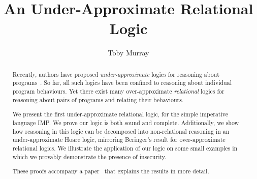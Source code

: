\documentclass[11pt,a4paper]{article}
\begin{document}
\title{An Under-Approximate Relational Logic}
\author{Toby Murray}
\maketitle

\begin{abstract}
  Recently, authors have proposed \emph{under-approximate} logics for
  reasoning about programs~\cite{OHearn_19,deVries_Koutavas_11}.
  So far, all such logics have been confined to
  reasoning about individual program behaviours. Yet there exist many
  over-approximate \emph{relational} logics for reasoning about pairs of
  programs and relating their behaviours.

  We present the first under-approximate relational
  logic, for the simple imperative language IMP.
  We prove our logic
  is both sound and complete.
  Additionally,
  we show how reasoning in this logic
  can be decomposed into non-relational reasoning in an under-approximate
  Hoare logic, mirroring Beringer's result for over-approximate
  relational logics.
  We illustrate the application of our logic on some small
  examples in which we provably demonstrate the presence of insecurity.

  These proofs accompany a paper~\cite{murray2020underapproximate}
  that explains the results in more detail.
\end{abstract}

\tableofcontents





\end{document}
